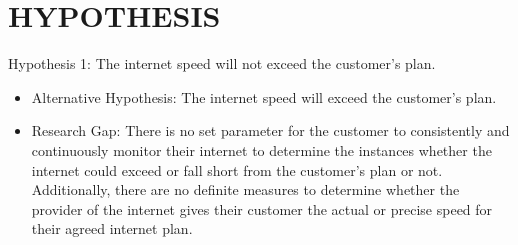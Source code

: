 \documentclass[conference]{IEEEtran}
\begin{document}
\section{HYPOTHESIS}
Hypothesis 1: The internet speed will not exceed the customer's plan.
\begin{itemize}
    \item Alternative Hypothesis: The internet speed will exceed the customer's plan.
    \item Research Gap: There is no set parameter for the customer to consistently and continuously monitor their internet to determine the instances whether the internet could exceed or fall short from the customer's plan or not. Additionally, there are no definite measures to determine whether the provider of the internet gives their customer the actual or precise speed for their agreed internet plan.
\end{itemize}
\end{document}
